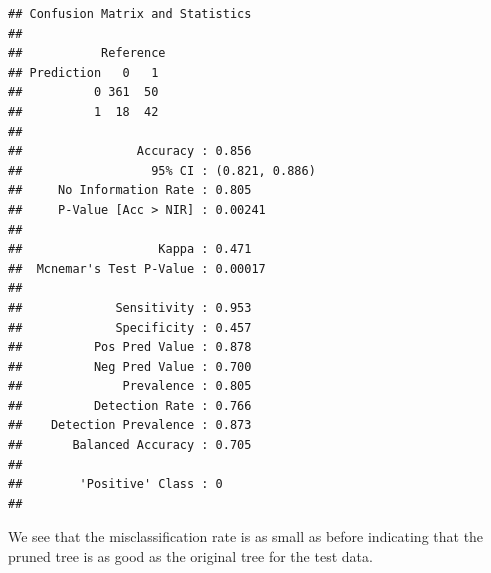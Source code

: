 \documentclass[ignorenonframetext,]{beamer}
\newenvironment{Shaded}{\begin{snugshade}}{\end{snugshade}}
\newcommand{\KeywordTok}[1]{\textcolor[rgb]{0.13,0.29,0.53}{\textbf{#1}}}
\newcommand{\DataTypeTok}[1]{\textcolor[rgb]{0.13,0.29,0.53}{#1}}
\newcommand{\StringTok}[1]{\textcolor[rgb]{0.31,0.60,0.02}{#1}}
\newcommand{\OperatorTok}[1]{\textcolor[rgb]{0.81,0.36,0.00}{\textbf{#1}}}
\newcommand{\NormalTok}[1]{#1}
\begin{document}
\begin{frame}[fragile]

\footnotesize

\begin{Shaded}
\end{Shaded}

\begin{verbatim}
## Confusion Matrix and Statistics
## 
##           Reference
## Prediction   0   1
##          0 361  50
##          1  18  42
##                                         
##                Accuracy : 0.856         
##                  95% CI : (0.821, 0.886)
##     No Information Rate : 0.805         
##     P-Value [Acc > NIR] : 0.00241       
##                                         
##                   Kappa : 0.471         
##  Mcnemar's Test P-Value : 0.00017       
##                                         
##             Sensitivity : 0.953         
##             Specificity : 0.457         
##          Pos Pred Value : 0.878         
##          Neg Pred Value : 0.700         
##              Prevalence : 0.805         
##          Detection Rate : 0.766         
##    Detection Prevalence : 0.873         
##       Balanced Accuracy : 0.705         
##                                         
##        'Positive' Class : 0             
## 
\end{verbatim}

\normalsize

We see that the misclassification rate is as small as before indicating
that the pruned tree is as good as the original tree for the test data.

\end{frame}
\end{document}
